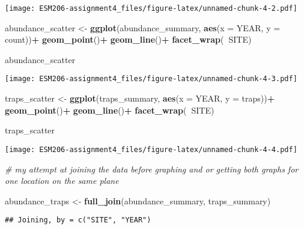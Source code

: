 \documentclass[]{article}
\newenvironment{Shaded}{\begin{snugshade}}{\end{snugshade}}
\newcommand{\KeywordTok}[1]{\textcolor[rgb]{0.13,0.29,0.53}{\textbf{#1}}}
\newcommand{\DataTypeTok}[1]{\textcolor[rgb]{0.13,0.29,0.53}{#1}}
\newcommand{\StringTok}[1]{\textcolor[rgb]{0.31,0.60,0.02}{#1}}
\newcommand{\CommentTok}[1]{\textcolor[rgb]{0.56,0.35,0.01}{\textit{#1}}}
\newcommand{\OperatorTok}[1]{\textcolor[rgb]{0.81,0.36,0.00}{\textbf{#1}}}
\newcommand{\NormalTok}[1]{#1}
\begin{document}
\texttt{[image: ESM206-assignment4\_files/figure-latex/unnamed-chunk-4-2.pdf]}

\begin{Shaded}
\begin{Highlighting}[]
\NormalTok{abundance_scatter <-}\StringTok{ }\KeywordTok{ggplot}\NormalTok{(abundance_summary, }\KeywordTok{aes}\NormalTok{(}\DataTypeTok{x =}\NormalTok{ YEAR, }\DataTypeTok{y =}\NormalTok{ count))}\OperatorTok{+}
\StringTok{  }\KeywordTok{geom_point}\NormalTok{()}\OperatorTok{+}
\StringTok{  }\KeywordTok{geom_line}\NormalTok{()}\OperatorTok{+}
\StringTok{  }\KeywordTok{facet_wrap}\NormalTok{(}\OperatorTok{~}\NormalTok{SITE)}

\NormalTok{abundance_scatter}
\end{Highlighting}
\end{Shaded}

\texttt{[image: ESM206-assignment4\_files/figure-latex/unnamed-chunk-4-3.pdf]}

\begin{Shaded}
\begin{Highlighting}[]
\NormalTok{traps_scatter <-}\StringTok{ }\KeywordTok{ggplot}\NormalTok{(traps_summary, }\KeywordTok{aes}\NormalTok{(}\DataTypeTok{x =}\NormalTok{ YEAR, }\DataTypeTok{y =}\NormalTok{ traps))}\OperatorTok{+}
\StringTok{  }\KeywordTok{geom_point}\NormalTok{()}\OperatorTok{+}
\StringTok{  }\KeywordTok{geom_line}\NormalTok{()}\OperatorTok{+}
\StringTok{  }\KeywordTok{facet_wrap}\NormalTok{(}\OperatorTok{~}\NormalTok{SITE)}

\NormalTok{traps_scatter}
\end{Highlighting}
\end{Shaded}

\texttt{[image: ESM206-assignment4\_files/figure-latex/unnamed-chunk-4-4.pdf]}

\begin{Shaded}
\begin{Highlighting}[]
\CommentTok{# my attempt at joining the data before graphing and or getting both graphs for one location on the same plane}

\NormalTok{abundance_traps <-}\StringTok{ }\KeywordTok{full_join}\NormalTok{(abundance_summary, traps_summary)}
\end{Highlighting}
\end{Shaded}

\begin{verbatim}
## Joining, by = c("SITE", "YEAR")
\end{verbatim}
\end{document}
